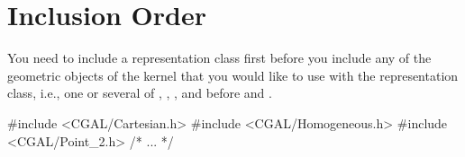 \section{Inclusion Order}
You need to include a representation class first before you include any of
the geometric objects of the kernel that you would like to use with
the representation class, i.e., one or several of 
, , ,
and 
before  and .

\ccExample
\begin{cprog}
#include <CGAL/Cartesian.h>
#include <CGAL/Homogeneous.h>
#include <CGAL/Point_2.h>
/* ... */
\end{cprog}

